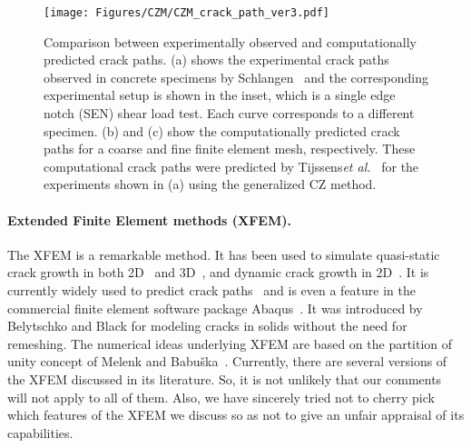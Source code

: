 \documentclass[10pt,letterpaper]{article}
\begin{document}
    \begin{figure}
          \centering
          \texttt{[image: Figures/CZM/CZM\_crack\_path\_ver3.pdf]}
          \caption{\footnotesize Comparison between experimentally observed and computationally predicted crack paths. (a) shows the experimental crack paths observed in concrete specimens by Schlangen~\cite{schlangen1993experimental} and the corresponding experimental setup is shown in the inset, which is a single edge notch (SEN) shear load test. Each curve corresponds to a different specimen. (b) and (c) show the computationally predicted crack paths for a coarse and fine finite  element mesh, respectively. These computational crack paths  were predicted by Tijssens\textit{et al.}~\cite{tijssens2000numerical} for the experiments shown in (a) using the generalized CZ method.}
          \label{f:czm}
    \end{figure}



\paragraph{Extended Finite Element methods (XFEM).} The XFEM is a remarkable method. It has been used to  simulate quasi-static crack growth in both 2D~\cite{belytschko1999elastic,bordas2007extended,dolbow1999finite} and 3D~\cite{sukumar2000extended,moes2002non,gravouil2002non}, and dynamic crack growth in 2D~\cite{belytschko2003dynamic,song2006method}. It is currently widely used to predict crack paths~\cite{golewski2012numerical,barkai2012crack,peng2017extended} and is even a feature in the commercial finite element software package Abaqus~\cite{abaqus2014}. It was introduced by Belytschko and Black \cite{belytschko1999elastic} for modeling cracks in solids without the need for remeshing. The numerical ideas underlying XFEM  are based on the partition of unity concept of Melenk and Babu\v ska~\cite{melenk1996partition}.  Currently, there are several versions of the XFEM  discussed in its literature. So, it is not unlikely that our comments will not apply to all of them. Also, we have sincerely tried not to cherry pick which features of the XFEM we discuss so as not to give an unfair appraisal of its capabilities.
\end{document}
